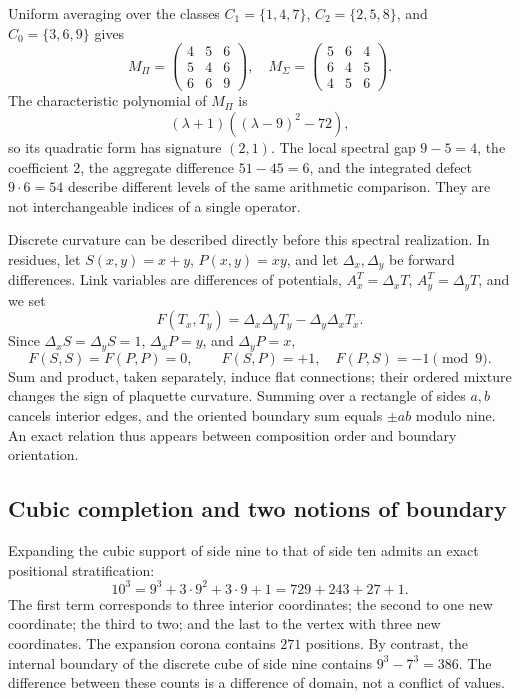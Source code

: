 Uniform averaging over the classes \(C_1=\{1,4,7\}\), \(C_2=\{2,5,8\}\), and \(C_0=\{3,6,9\}\) gives
\[
 M_\Pi=\begin{pmatrix}4&5&6\\5&4&6\\6&6&9\end{pmatrix},\quad
 M_\Sigma=\begin{pmatrix}5&6&4\\6&4&5\\4&5&6\end{pmatrix}.
\]
The characteristic polynomial of \(M_\Pi\) is
\[
 (\lambda+1)((\lambda-9)^2-72),
\]
so its quadratic form has signature \((2,1)\). The local spectral gap \(9-5=4\), the coefficient \(2\), the aggregate difference \(51-45=6\), and the integrated defect \(9\cdot6=54\) describe different levels of the same arithmetic comparison. They are not interchangeable indices of a single operator.

Discrete curvature can be described directly before this spectral realization. In residues, let \(S(x,y)=x+y\), \(P(x,y)=xy\), and let \(\Delta_x,\Delta_y\) be forward differences. Link variables are differences of potentials, \(A_x^T=\Delta_xT\), \(A_y^T=\Delta_yT\), and we set
\[
 F(T_x,T_y)=\Delta_x\Delta_yT_y-\Delta_y\Delta_xT_x.
\]
Since \(\Delta_xS=\Delta_yS=1\), \(\Delta_xP=y\), and \(\Delta_yP=x\),
\begin{equation}
 F(S,S)=F(P,P)=0,\qquad F(S,P)=+1,\quad F(P,S)=-1\pmod9.
\end{equation}
Sum and product, taken separately, induce flat connections; their ordered mixture changes the sign of plaquette curvature. Summing over a rectangle of sides \(a,b\) cancels interior edges, and the oriented boundary sum equals \(\pm ab\) modulo nine. An exact relation thus appears between composition order and boundary orientation.

\subsection{Cubic completion and two notions of boundary}

Expanding the cubic support of side nine to that of side ten admits an exact positional stratification:
\begin{equation}
 10^3=9^3+3\cdot9^2+3\cdot9+1=729+243+27+1.
 \label{eq:cubo}
\end{equation}
The first term corresponds to three interior coordinates; the second to one new coordinate; the third to two; and the last to the vertex with three new coordinates. The expansion corona contains \(271\) positions. By contrast, the internal boundary of the discrete cube of side nine contains \(9^3-7^3=386\). The difference between these counts is a difference of domain, not a conflict of values.


